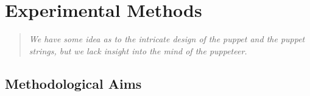 \documentclass[../main.tex]{subfiles}
\begin{document}
\chapter{Experimental Methods}\label{chap:methods}

\bigskip
\begin{quote}
    \emph{We have some idea as to the intricate design of the puppet and the puppet strings, but we lack insight into the mind of the puppeteer\cite{bizziHardScientificQuest2015}.}\\
\end{quote}

\cleardoublepage%


\section{Methodological Aims}\label{sec:methods_aims}
\end{document}
